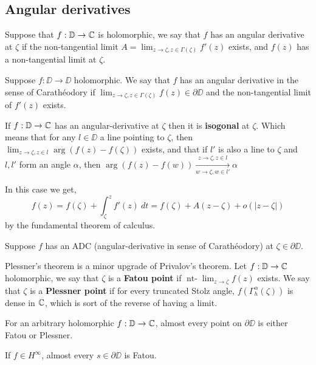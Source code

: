 \subsection{Angular derivatives}
\begin{definition}
	Suppose that $f : \mathbb{D} \to \mathbb{C}$ is holomorphic, we say that $f$ has an angular derivative at $\zeta$ if the non-tangential limit $A = \lim_{z \to \zeta, z \in \Gamma(\zeta)} f'(z)$ exists,
	and $f(z)$ has a non-tangential limit at $\zeta$.
\end{definition}
\begin{definition}
	Suppose $f : \DD \to \DD$ holomorphic.
	We say that $f$ has an angular derivative in the sense of Carathéodory if $\lim_{z \to \zeta, z \in \Gamma(\zeta)} f(z) \in \partial \DD$ and the non-tangential limit of $f'(z)$ exists.
\end{definition}
\begin{lemma}
	If $f : \mathbb{D} \to \mathbb{C}$ has an angular-derivative at $\zeta$ then it is \textbf{isogonal} at $\zeta$.
	Which means that for any $l \in \DD$ a line pointing to $\zeta$, then $\lim_{z \to \zeta, z \in l} \arg(f(z) - f(\zeta))$ exists,
	and that if $l'$ is also a line to $\zeta$ and $l, l'$ form an angle $\alpha$, then $\arg(f(z) - f(w)) \xrightarrow[w \to \zeta, w \in l']{z \to \zeta, z \in l} \alpha$
\end{lemma}
In this case we get,
\[
	f(z)
	= f(\zeta) + \int_{\zeta}^{z} f'(z)\ dt
	= f(\zeta) + A(z - \zeta) + o(|z - \zeta|)
\]
by the fundamental theorem of calculus.
\begin{lemma}
	Suppose $f$ has an ADC (angular-derivative in sense of Carathéodory) at $\zeta \in \partial \DD$.
\end{lemma}
Plessner's theorem is a minor upgrade of Privalov's theorem.
Let $f : \mathbb{D} \to \mathbb{C}$ holomorphic, we say that $\zeta$ is a \textbf{Fatou point} if $\operatorname{nt-}\lim_{z \to \zeta} f(z)$ exists.
We say that $\zeta$ is a \textbf{Plessner point} if for every truncated Stolz angle, $f(\Gamma_h^{\alpha}(\zeta))$ is dense in $\mathbb{C}$, which is sort of the reverse of having a limit.
\begin{theorem}[Plessner]
	For an arbitrary holomorphic $f : \mathbb{D} \to \mathbb{C}$, almost every point on $\partial \DD$ is either Fatou or Plessner.
\end{theorem}
\begin{theorem}[Fatou]
	If $f \in H^\infty$, almost every $s \in \partial \DD$ is Fatou.
\end{theorem}

